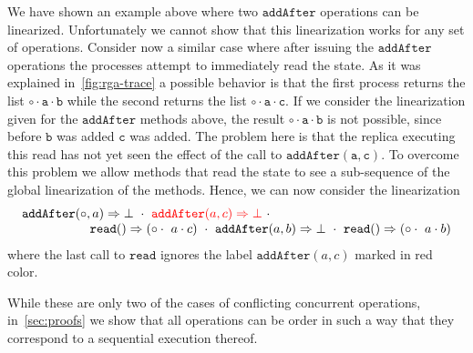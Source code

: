 We have shown an example above where two $\mathtt{addAfter}$
operations can be linearized.
%
Unfortunately we cannot show that this linearization works for any set
of operations.
%
Consider now a similar case where after issuing the
$\mathtt{addAfter}$ operations the processes attempt to immediately
read the state.
%
As it was explained in~\autoref{fig:rga-trace} a possible behavior is
that the first process returns the list $\mathtt{\circ \cdot a \cdot
  b}$ while the second returns the list $\mathtt{\circ \cdot a \cdot
  c}$. 
%
If we consider the linearization given for the $\mathtt{addAfter}$
methods above, the result $\mathtt{\circ \cdot a \cdot b}$ is not
possible, since before $\mathtt{b}$ was added $\mathtt{c}$ was added.
%
The problem here is that the replica executing this read has not yet
seen the effect of the call to $\mathtt{addAfter(a, c)}$.
%
To overcome this problem we allow methods that read the state to see a
sub-sequence of the global linearization of the methods.
%
Hence, we can now consider the linearization 
\[
  \begin{array}{c}
    \alabellong[\mathtt{addAfter}]{\circ,a}{\bot}\ \cdot\
    {\color{red} \alabellong[\mathtt{addAfter}]{a,c}{\bot}}\ \cdot \kern5cm\\    
    \hspace{\fill} \alabellong[\mathtt{read}]{}{(\circ \cdot\ a \cdot c)}\ \cdot\
    \alabellong[\mathtt{addAfter}]{a,b}{\bot}\ \cdot\
    \alabellong[\mathtt{read}]{}{(\circ \cdot\ a \cdot b)}
  \end{array}
\]
where the last call to $\mathtt{read}$ ignores the label
$\mathtt{addAfter}(a, c)$ marked in red color.

While these are only two of the cases of conflicting concurrent
operations, in~\autoref{sec:proofs} we show that all operations
can be order in such a way that they correspond to a sequential
execution thereof.


